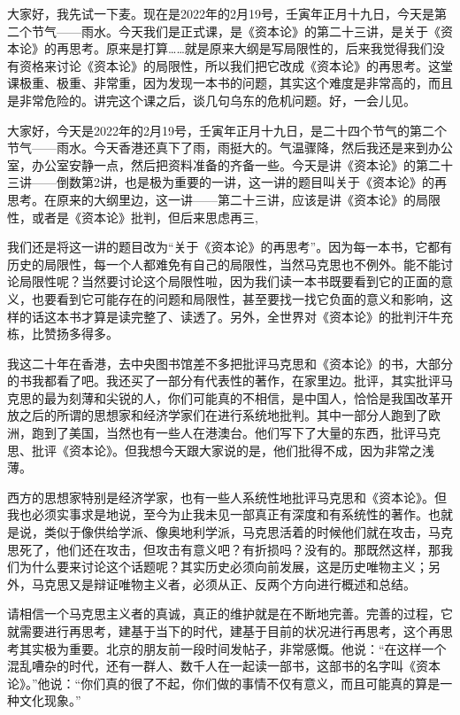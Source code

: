 \documentclass[UTF8, 12pt, a4paper]{ctexrep}
\begin{document}
大家好，我先试一下麦。现在是2022年的2月19号，壬寅年正月十九日，今天是第二个节气——雨水。今天我们是正式课，是《资本论》的第二十三讲，是关于《资本论》的再思考。原来是打算……就是原来大纲是写局限性的，后来我觉得我们没有资格来讨论《资本论》的局限性，所以我们把它改成《资本论》的再思考。这堂课极重、极重、非常重，因为发现一本书的问题，其实这个难度是非常高的，而且是非常危险的。讲完这个课之后，谈几句乌东的危机问题。好，一会儿见。

大家好，今天是2022年的2月19号，壬寅年正月十九日，是二十四个节气的第二个节气——雨水。今天香港还真下了雨，雨挺大的。气温骤降，然后我还是来到办公室，办公室安静一点，然后把资料准备的齐备一些。今天是讲《资本论》的第二十三讲——倒数第2讲，也是极为重要的一讲，这一讲的题目叫关于《资本论》的再思考。在原来的大纲里边，这一讲——第二十三讲，应该是讲《资本论》的局限性，或者是《资本论》批判，但后来思虑再三,

我们还是将这一讲的题目改为“关于《资本论》的再思考”。因为每一本书，它都有历史的局限性，每一个人都难免有自己的局限性，当然马克思也不例外。能不能讨论局限性呢？当然要讨论这个局限性啦，因为我们读一本书既要看到它的正面的意义，也要看到它可能存在的问题和局限性，甚至要找一找它负面的意义和影响，这样的话这本书才算是读完整了、读透了。另外，全世界对《资本论》的批判汗牛充栋，比赞扬多得多。

我这二十年在香港，去中央图书馆差不多把批评马克思和《资本论》的书，大部分的书我都看了吧。我还买了一部分有代表性的著作，在家里边。批评，其实批评马克思的最为刻薄和尖锐的人，你们可能真的不相信，是中国人，恰恰是我国改革开放之后的所谓的思想家和经济学家们在进行系统地批判。其中一部分人跑到了欧洲，跑到了美国，当然也有一些人在港澳台。他们写下了大量的东西，批评马克思、批评《资本论》。但我想今天跟大家说的是，他们批得不成，因为非常之浅薄。

西方的思想家特别是经济学家，也有一些人系统性地批评马克思和《资本论》。但我也必须实事求是地说，至今为止我未见一部真正有深度和有系统性的著作。也就是说，类似于像供给学派、像奥地利学派，马克思活着的时候他们就在攻击，马克思死了，他们还在攻击，但攻击有意义吧？有折损吗？没有的。那既然这样，那我们为什么要来讨论这个话题呢？其实历史必须向前发展，这是历史唯物主义；另外，马克思又是辩证唯物主义者，必须从正、反两个方向进行概述和总结。

请相信一个马克思主义者的真诚，真正的维护就是在不断地完善。完善的过程，它就需要进行再思考，建基于当下的时代，建基于目前的状况进行再思考，这个再思考其实极为重要。北京的朋友前一段时间发帖子，非常感慨。他说：“在这样一个混乱嘈杂的时代，还有一群人、数千人在一起读一部书，这部书的名字叫《资本论》。”他说：“你们真的很了不起，你们做的事情不仅有意义，而且可能真的算是一种文化现象。”
\end{document}

